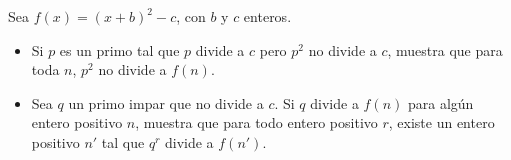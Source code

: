 Sea $f(x)=(x+b)^2-c$, con $b$ y $c$ enteros.
 \begin{itemize}  
 \item  Si $p$ es un primo tal que $p$ divide a $c$ pero $p^2$ no divide a $c$, muestra que para toda $n$, $p^2$ no divide a $f(n)$.
 \item   Sea $q$ un primo impar que no divide a $c$. Si $q$ divide a $f(n)$ para algún entero positivo $n$, muestra que para todo entero positivo $r$, existe un entero positivo $n'$ tal que $q^r$ divide a $f(n')$.
 \end{itemize} 
